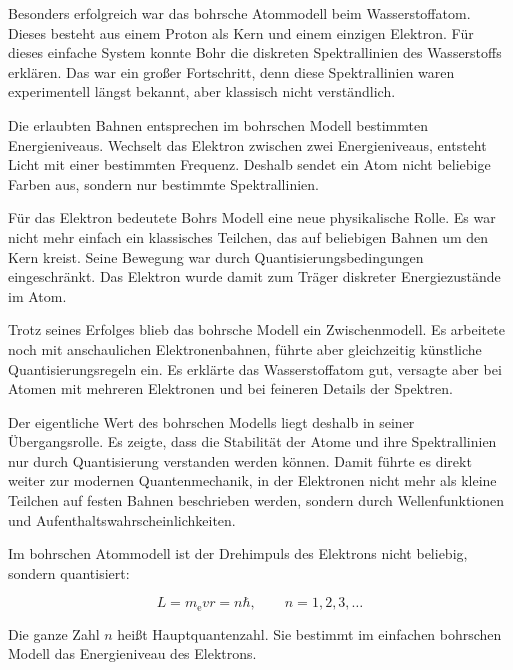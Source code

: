 Besonders erfolgreich war das bohrsche Atommodell beim Wasserstoffatom. Dieses
besteht aus einem Proton als Kern und einem einzigen Elektron. Für dieses
einfache System konnte Bohr die diskreten Spektrallinien des Wasserstoffs
erklären. Das war ein großer Fortschritt, denn diese Spektrallinien waren
experimentell längst bekannt, aber klassisch nicht verständlich.

Die erlaubten Bahnen entsprechen im bohrschen Modell bestimmten Energieniveaus.
Wechselt das Elektron zwischen zwei Energieniveaus, entsteht Licht mit einer
bestimmten Frequenz. Deshalb sendet ein Atom nicht beliebige Farben aus,
sondern nur bestimmte Spektrallinien.

Für das Elektron bedeutete Bohrs Modell eine neue physikalische Rolle. Es war
nicht mehr einfach ein klassisches Teilchen, das auf beliebigen Bahnen um den
Kern kreist. Seine Bewegung war durch Quantisierungsbedingungen eingeschränkt.
Das Elektron wurde damit zum Träger diskreter Energiezustände im Atom.

Trotz seines Erfolges blieb das bohrsche Modell ein Zwischenmodell. Es arbeitete
noch mit anschaulichen Elektronenbahnen, führte aber gleichzeitig künstliche
Quantisierungsregeln ein. Es erklärte das Wasserstoffatom gut, versagte aber
bei Atomen mit mehreren Elektronen und bei feineren Details der Spektren.

Der eigentliche Wert des bohrschen Modells liegt deshalb in seiner Übergangsrolle.
Es zeigte, dass die Stabilität der Atome und ihre Spektrallinien nur durch
Quantisierung verstanden werden können. Damit führte es direkt weiter zur
modernen Quantenmechanik, in der Elektronen nicht mehr als kleine Teilchen auf
festen Bahnen beschrieben werden, sondern durch Wellenfunktionen und
Aufenthaltswahrscheinlichkeiten.





\begin{MathBox}
	
	\label{box:bohr-drehimpulsquantisierung}
	Im bohrschen Atommodell ist der Drehimpuls des Elektrons nicht beliebig,
	sondern quantisiert:
	
	\[
	L = m_\mathrm{e} v r = n \hbar ,
	\qquad n = 1,2,3,\ldots
	\]
	
	Die ganze Zahl \(n\) heißt Hauptquantenzahl. Sie bestimmt im einfachen
	bohrschen Modell das Energieniveau des Elektrons.
	
\end{MathBox}